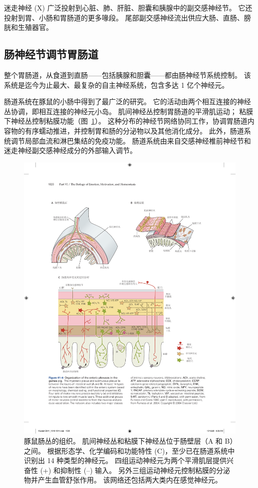 迷走神经 (X) 广泛投射到心脏、肺、肝脏、胆囊和胰腺中的副交感神经节。
它还投射到胃、小肠和胃肠道的更多喙段。
尾部副交感神经流出供应大肠、直肠、膀胱和生殖器官。



\subsection{肠神经节调节胃肠道}

整个胃肠道，从食道到直肠——包括胰腺和胆囊——都由肠神经节系统控制。
该系统是迄今为止最大、最复杂的自主神经系统，包含多达 1 亿个神经元。


肠道系统在豚鼠的小肠中得到了最广泛的研究。
它的活动由两个相互连接的神经丛协调，即相互连接的神经元小岛。
肌间神经丛控制胃肠道的平滑肌运动；
粘膜下神经丛控制粘膜功能（图~\ref{fig:41_6}）。 
这种分布的神经节网络协同工作，协调胃肠道内容物的有序蠕动推进，并控制胃和肠的分泌物以及其他消化成分。
此外，肠道系统调节局部血流和淋巴集结的免疫功能。
肠道系统由来自交感神经椎前神经节和迷走神经副交感神经成分的外部输入调节。



\begin{figure}[htbp]
	\centering
	\includegraphics[width=1.0\linewidth]{chap41/fig_41_6}
	\caption{豚鼠肠丛的组织。
		肌间神经丛和粘膜下神经丛位于肠壁层（A 和 B）之间。
		根据形态学、化学编码和功能特性 (C)，至少已在肠道系统中识别出 14 种类型的神经元。
		四组运动神经元为两个平滑肌层提供兴奋性 (+) 和抑制性 (–) 输入。
		另外三组运动神经元控制粘膜的分泌物并产生血管舒张作用。
		该网络还包括两大类内在感觉神经元。\cite{furness1980types}}
	\label{fig:41_6}
\end{figure}


